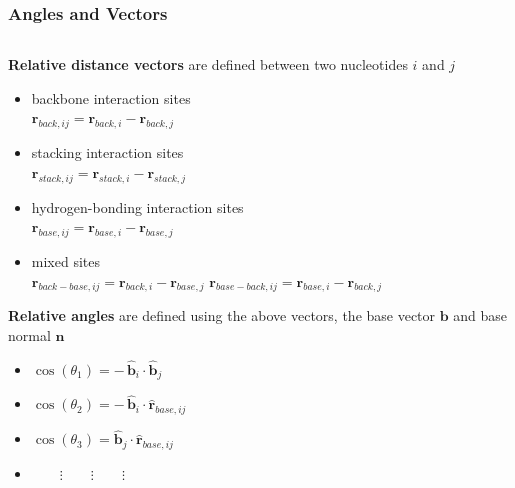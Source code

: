 \documentclass[slidestop,compress,9pt]{beamer}
\begin{document}
\begin{frame}
\frametitle{Angles and Vectors}

\begin{columns}
\begin{column}{0.56\textwidth}
\textbf{Relative distance vectors} are defined between two nucleotides $i$ and $j$
\begin{itemize}
\setlength\itemsep{3pt}
\item backbone interaction sites\\
$\bm{r}_{back, ij}=\bm{r}_{back,i} - \bm{r}_{back,j}$
\item stacking interaction sites\\
$\bm{r}_{stack, ij}=\bm{r}_{stack,i} - \bm{r}_{stack,j}$
\item hydrogen-bonding interaction sites\\
$\bm{r}_{base, ij}=\bm{r}_{base,i} - \bm{r}_{base,j}$
\item mixed sites\\
$\bm{r}_{back-base, ij}=\bm{r}_{back,i} - \bm{r}_{base,j}$
$\bm{r}_{base-back, ij}=\bm{r}_{base,i} - \bm{r}_{back,j}$
\end{itemize}
\textbf{Relative angles} are defined using the above vectors, the base vector $\bm{b}$ and base normal $\bm{n}$ 
\vspace*{0.25cm}
\begin{itemize}
\item[] $\cos(\theta_1) = -\,\hat{\bm{b}}_i \cdot \hat{\bm{b}}_j$
\item[] $\cos(\theta_2) = -\,\hat{\bm{b}}_i \cdot \hat{\bm{r}}_{base, ij}$
\item[] $\cos(\theta_3) = \hat{\bm{b}}_j \cdot \hat{\bm{r}}_{base, ij}$
\item[] $\qquad\vdots\qquad\vdots\qquad\vdots$
\end{itemize}
\end{column}


\end{columns}
\end{frame}
\end{document}
